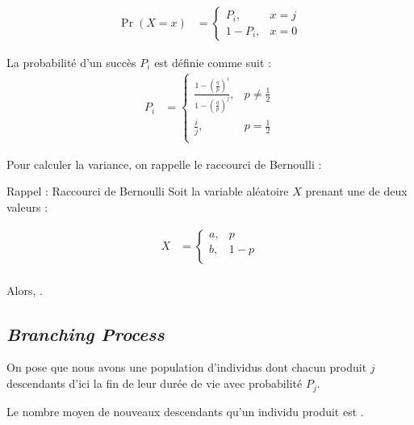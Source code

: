 \documentclass[french]{article}
\begin{document}
\begin{multicols*}{2}
\begin{definitionNOHFILLprop}
\begin{align*}
	\Pr(X = x)
	&=	\begin{cases}
		P_{i},		&	x = j	\\
		1 - P_{i},	&	x = 0
	\end{cases}
\end{align*}

\bigskip

La probabilité d'un succès $P_{i}$ est définie comme suit : 
\begin{align*}
	P_{i}
	&=	\begin{cases}
		\frac{1 - \left(\frac{q}{p}\right)^{i}}{1 - \left(\frac{q}{p}\right)^{j}},	&	p \neq \frac{1}{2}	\\
		\frac{i}{j},	&	p = \frac{1}{2}	\\
	\end{cases}
\end{align*}
\end{definitionNOHFILLprop}

Pour calculer la variance, on rappelle le raccourci de Bernoulli :
\begin{rappel}{Rappel : Raccourci de Bernoulli}
Soit la variable aléatoire $X$ prenant une de deux valeurs : 

\begin{align*}
	X
	&=	\begin{cases}
		a,	&	p	\\
		b,	&	1 - p	\\
	\end{cases}	\\
\end{align*}

Alors, .
\end{rappel}



\columnbreak
\subsection{\og \textit{Branching Process} \fg{}}
\begin{rappel_enhanced}[Contexte]
On pose que nous avons une population d'individus dont chacun produit $j$ descendants d'ici la fin de leur durée de vie avec probabilité $P_{j}$.

\bigskip

Le nombre moyen de nouveaux descendants qu'un individu produit est .

\bigskip


\end{rappel_enhanced}
\end{multicols*}
\end{document}

